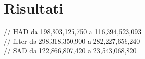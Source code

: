 
\chapter{Risultati} %

\label{Chapter7} %


// HAD da 198,803,125,750 a 116,394,523,093 \\
// filter da 298,318,350,900 a 282,227,659,240 \\
// SAD da 122,866,807,420 a 23,543,068,820 \\
